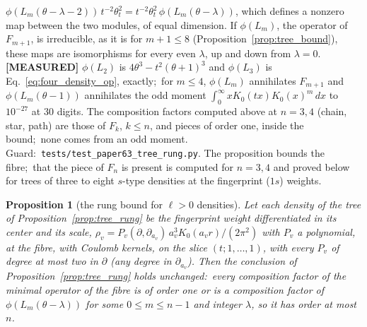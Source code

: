 \documentclass[aps,pra,twocolumn,superscriptaddress,longbibliography]{revtex4-2}
\newtheorem{proposition}{Proposition}
\begin{document}
$\phi(L_m(\theta-\lambda-2))\,t^{-2}\theta_t^2=t^{-2}\theta_t^2\,\phi(L_m(\theta-\lambda))$,
which defines a nonzero map between the two modules, of equal dimension.  If
$\phi(L_m)$, the operator of $F_{m+1}$, is irreducible, as it is for $m+1\le8$
(Proposition~\ref{prop:tree_bound}), these maps are isomorphisms for every even
$\lambda$, up and down from $\lambda=0$.  \textbf{[MEASURED]} $\phi(L_2)$ is
$4\theta^3-t^2(\theta+1)^3$ and $\phi(L_3)$ is
Eq.~\eqref{eq:four_density_op}, exactly;\ for $m\le4$, $\phi(L_m)$ annihilates
$F_{m+1}$ and $\phi(L_m(\theta-1))$ annihilates the odd moment
$\int_0^\infty xK_0(tx)K_0(x)^m\,dx$ to $10^{-27}$ at 30 digits.  The
composition factors computed above at $n=3,4$ (chain, star, path) are those
of $F_k$, $k\le n$, and pieces of order one, inside the bound;\ none comes from
an odd moment.  Guard:\ \texttt{tests/test\_paper63\_tree\_rung.py}.  The
proposition bounds the fibre;\ that the piece of $F_n$ is present is computed
for $n=3,4$ and proved below for trees of three to eight $s$-type densities at the fingerprint ($1s$) weights.

\begin{proposition}[the rung bound for $\ell>0$ densities]
\label{prop:tree_rung_l}
Let each density of the tree of Proposition~\ref{prop:tree_rung} be the
fingerprint weight differentiated in its center and its scale,
$\rho_v=P_v(\partial,\partial_{a_v})\,a_v^3K_0(a_vr)/(2\pi^2)$ with $P_v$ a
polynomial, at the fibre, with Coulomb kernels, on the slice
$(t;1,\dots,1)$, with every $P_v$ of degree at most two in $\partial$ (any
degree in $\partial_{a_v}$).  Then the conclusion of
Proposition~\ref{prop:tree_rung} holds unchanged:\ every composition factor of
the minimal operator of the fibre is of order one or is a composition factor
of $\phi(L_m(\theta-\lambda))$ for some $0\le m\le n-1$ and integer
$\lambda$, so it has order at most $n$.
\end{proposition}
\end{document}
